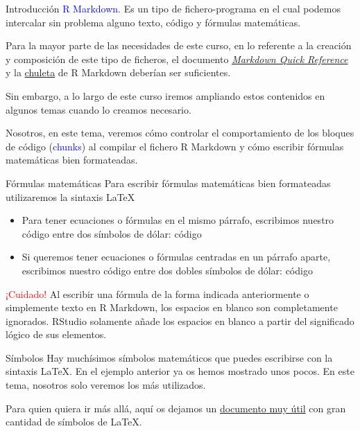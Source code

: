 \documentclass[
  ignorenonframetext,
  aspectratio=169]{beamer}
\providecommand{\tightlist}{%
  \setlength{\itemsep}{0pt}\setlength{\parskip}{0pt}}
\newcommand\blue[1]{\textcolor{blue}{#1}}
\newcommand\red[1]{\textcolor{red}{#1}}
\begin{document}
\begin{frame}{Introducción}
\label{introducciuxf3n}
\blue{R Markdown.} Es un tipo de fichero-programa en el cual podemos
intercalar sin problema alguno texto, código y fórmulas matemáticas.

Para la mayor parte de las necesidades de este curso, en lo referente a
la creación y composición de este tipo de ficheros, el documento
\emph{\href{https://en.support.wordpress.com/markdown-quick-reference/}{Markdown
Quick Reference} } y la
\href{https://www.rstudio.com/wp-content/uploads/2015/02/rmarkdown-cheatsheet.pdf}{chuleta}
de R Markdown deberían ser suficientes.

Sin embargo, a lo largo de este curso iremos ampliando estos contenidos
en algunos temas cuando lo creamos necesario.

Nosotros, en este tema, veremos cómo controlar el comportamiento de los
bloques de código (\blue{chunks}) al compilar el fichero R Markdown y
cómo escribir fórmulas matemáticas bien formateadas.
\end{frame}

\begin{frame}{Fórmulas matemáticas}
\label{fuxf3rmulas-matemuxe1ticas}
Para escribir fórmulas matemáticas bien formateadas utilizaremos la
sintaxis \LaTeX

\begin{itemize}
\tightlist
\item
  Para tener ecuaciones o fórmulas en el mismo párrafo, escribimos
  nuestro código entre dos símbolos de dólar: código
\item
  Si queremos tener ecuaciones o fórmulas centradas en un párrafo
  aparte, escribimos nuestro código entre dos dobles símbolos de dólar:
  código
\end{itemize}

\red{¡Cuidado!} Al escribir una fórmula de la forma indicada
anteriormente o simplemente texto en R Markdown, los espacios en blanco
son completamente ignorados. RStudio solamente añade los espacios en
blanco a partir del significado lógico de sus elementos.
\end{frame}

\begin{frame}{Símbolos}
\label{suxedmbolos}
Hay muchísimos símbolos matemáticos que puedes escribirse con la
sintaxis \LaTeX. En el ejemplo anterior ya os hemos mostrado unos pocos.
En este tema, nosotros solo veremos los más utilizados.

Para quien quiera ir más allá, aquí os dejamos un
\href{http://www.ptep-online.com/ctan/symbols.pdf}{documento muy útil}
con gran cantidad de símbolos de \LaTeX.
\end{frame}
\end{document}
